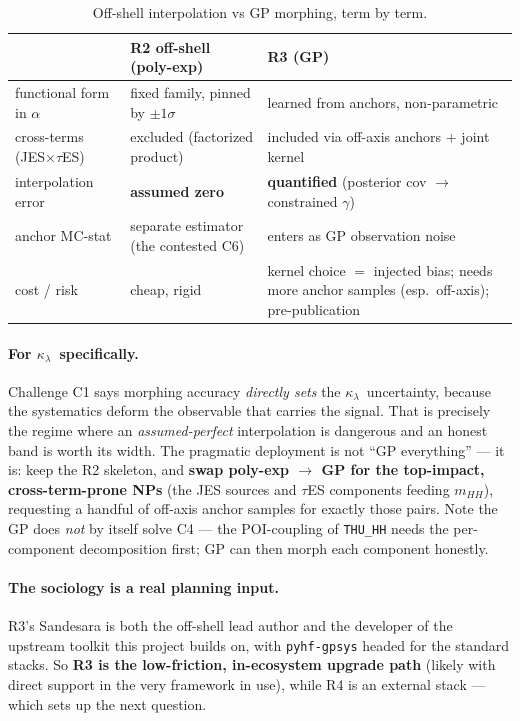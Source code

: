 \documentclass[11pt]{article}
\newcommand{\kl}{\ensuremath{\kappa_\lambda}}
\newcommand{\mhh}{\ensuremath{m_{HH}}}
\begin{document}
\begin{table}[htbp]\centering\small
\begin{tabular}{@{}p{}p{}p{}@{}}
\toprule
 & \textbf{R2 off-shell (poly-exp)} & \textbf{R3 (GP)}\\
\midrule
functional form in $\alpha$ & fixed family, pinned by $\pm1\sigma$ & learned from anchors, non-parametric\\
cross-terms (JES$\times\tau$ES) & excluded (factorized product) & included via off-axis anchors $+$ joint kernel\\
interpolation error & \textbf{assumed zero} & \textbf{quantified} (posterior cov $\to$ constrained $\gamma$)\\
anchor MC-stat & separate estimator (the contested C6) & enters as GP observation noise\\
cost / risk & cheap, rigid & kernel choice $=$ injected bias; needs more anchor samples (esp.\ off-axis);
  pre-publication\\
\bottomrule
\end{tabular}
\caption{Off-shell interpolation vs GP morphing, term by term.}
\label{tab:gp}
\end{table}

\paragraph{For \kl\ specifically.} Challenge C1 says morphing accuracy \emph{directly sets} the \kl\
uncertainty, because the systematics deform the observable that carries the signal. That is precisely the
regime where an \emph{assumed-perfect} interpolation is dangerous and an honest band is worth its width. The
pragmatic deployment is not ``GP everything'' --- it is: keep the R2 skeleton, and \textbf{swap poly-exp $\to$
GP for the top-impact, cross-term-prone NPs} (the JES sources and $\tau$ES components feeding \mhh), requesting
a handful of off-axis anchor samples for exactly those pairs. Note the GP does \emph{not} by itself solve C4
--- the POI-coupling of \texttt{THU\_HH} needs the per-component decomposition first; GP can then morph each
component honestly.

\paragraph{The sociology is a real planning input.} R3's Sandesara is both the off-shell lead author and the
developer of the upstream toolkit this project builds on, with \texttt{pyhf-gpsys} headed for the standard
stacks. So \textbf{R3 is the low-friction, in-ecosystem upgrade path} (likely with direct support in the very
framework in use), while R4 is an external stack --- which sets up the next question.
\end{document}

